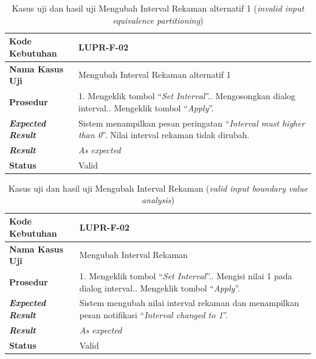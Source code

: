 \begin{longtable}{|L{3cm}|L{9cm}|}
  \caption{Kasus uji dan hasil uji Mengubah Interval Rekaman alternatif
  1 (\emph{invalid input equivalence partitioning})}\label{tab:val-set-interval-ep-2} \\
  \hline
  \textbf{Kode Kebutuhan} & LUPR-F-02 \\\hline
  \textbf{Nama Kasus Uji} & Mengubah Interval Rekaman alternatif 1\\\hline
  \textbf{Prosedur} & 1. Mengeklik tombol ``\emph{Set Interval}''.. Mengosongkan dialog interval.. Mengeklik tombol ``\emph{Apply}''.\\\hline
  \textbf{\emph{Expected Result}} & Sistem menampilkan pesan peringatan ``\emph{Interval must higher
                                    than 0}''. Nilai interval
                                    rekaman tidak dirubah. \\\hline
  \textbf{\emph{Result}} & \emph{As expected} \\\hline
  \textbf{Status} & Valid\\\hline
\end{longtable}
\newpage %
\begin{longtable}{|L{3cm}|L{9cm}|}
  \caption{Kasus uji dan hasil uji Mengubah Interval Rekaman
  (\emph{valid input boundary value analysis})}\label{tab:val-set-interval-bva-1} \\
  \hline
  \textbf{Kode Kebutuhan} & LUPR-F-02 \\\hline
  \textbf{Nama Kasus Uji} & Mengubah Interval Rekaman \\\hline
  \textbf{Prosedur} & 1. Mengeklik tombol ``\emph{Set Interval}''.. Mengisi nilai 1 pada dialog interval.. Mengeklik tombol ``\emph{Apply}''.\\\hline
  \textbf{\emph{Expected Result}} & Sistem mengubah nilai interval rekaman dan menampilkan pesan
                                    notifikasi ``\emph{Interval changed to 1}''. \\\hline
  \textbf{\emph{Result}} & \emph{As expected} \\\hline
  \textbf{Status} & Valid\\\hline
\end{longtable}

